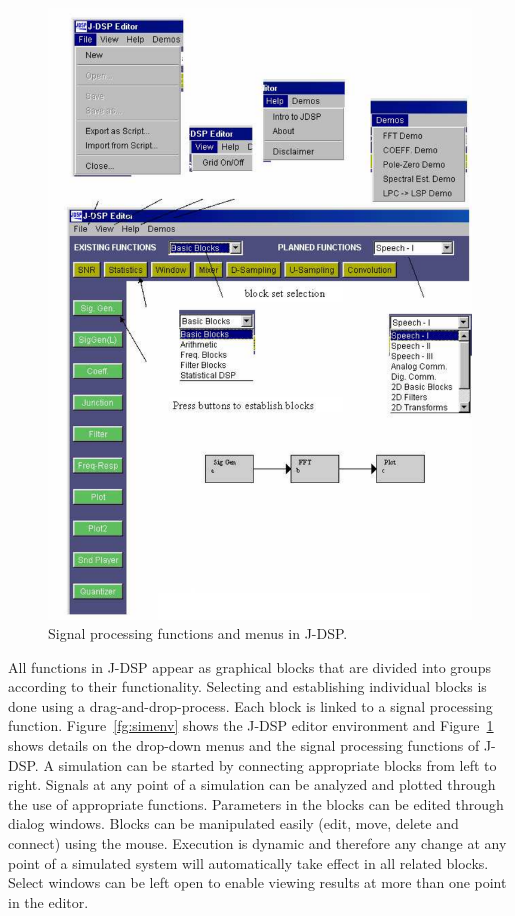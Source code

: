 \begin{figure}
\begin{center}
\includegraphics[height=0.5\textheight]{lab1/menus}
\end{center}
\caption{Signal processing functions and menus in J-DSP.\label{fg:menus}}
\end{figure}

All functions in J-DSP appear as graphical blocks that are divided
into groups according to their functionality. Selecting and
establishing individual blocks is done using a
drag-and-drop-process. Each block is linked to a signal processing
function. Figure~\ref{fg:simenv} shows the J-DSP editor environment
and Figure~\ref{fg:menus} shows details on the drop-down menus and the
signal processing functions of J-DSP. A simulation can be started by
connecting appropriate blocks from left to right. Signals at any point
of a simulation can be analyzed and plotted through the use of
appropriate functions. Parameters in the blocks can be edited through
dialog windows. Blocks can be manipulated easily (edit, move, delete
and connect) using the mouse. Execution is dynamic and therefore any
change at any point of a simulated system will automatically take
effect in all related blocks. Select windows can be left open to
enable viewing results at more than one point in the editor.

